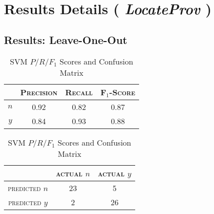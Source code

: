 %



\chapter{Results Details ( {\it LocateProv} )}
\section{Results: Leave-One-Out}
\begin{table}[ht]
\begin{minipage}[b]{0.45\linewidth}\centering
\begin{tabular}{ c | c  c  c }
	& \textsc{Precision} & \textsc{Recall} & \textsc{F$_1$-Score} \\
	\hline
	\textsc{$n$} 	& 0.92  &    0.82   &   0.87 \\
	\textsc{$y$}	& 0.84  &    0.93   &   0.88
\end{tabular}
\end{minipage}
\hspace{0.5cm}
\begin{minipage}[b]{0.45\linewidth}
\centering
\begin{tabular}{ c | c  c }
	 & \textsc{actual $n$} & \textsc{actual $y$} \\
	\hline
	\textsc{predicted $n$} 	& 23 & 5 \\
	\textsc{predicted $y$}		& 2 & 26
\end{tabular}
\end{minipage}
\caption{SVM $P/R/F_1$ Scores and Confusion Matrix}
\end{table}

